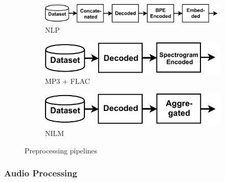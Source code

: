 \vspace{-0.1cm}
\begin{figure}[h]
    \centering
    \begin{subfigure}[b]{0.38\textwidth}
        \centering
        \includegraphics[width=\textwidth]{figures/openwebtext-pipeline/pipeline.pdf}
        \caption[]%
        {{\small NLP }}    
        \label{fig:nlp-pipeline}
    \end{subfigure}
    \hfill
    \begin{subfigure}[b]{0.23\textwidth}  
        \centering 
        \includegraphics[width=\textwidth]{figures/commonvoice-pipeline/pipeline.pdf}
        \caption[]%
        {{\small MP3 + FLAC}}    
        \label{fig:audio-pipeline}
    \end{subfigure}
    \hfill
    \begin{subfigure}[b]{0.23\textwidth}   
        \centering 
        \includegraphics[width=\textwidth]{figures/cream-pipeline/pipeline.pdf}
        \caption[]%
        {{\small NILM }}    
        \label{fig:cream-pipeline}
    \end{subfigure}
    \vspace*{-0.3cm}
    \caption[]
    {\small Preprocessing pipelines} 
    \label{fig:all-pipelines}
\end{figure}
\vspace{-0.45cm}

\subsubsection{Audio Processing}

